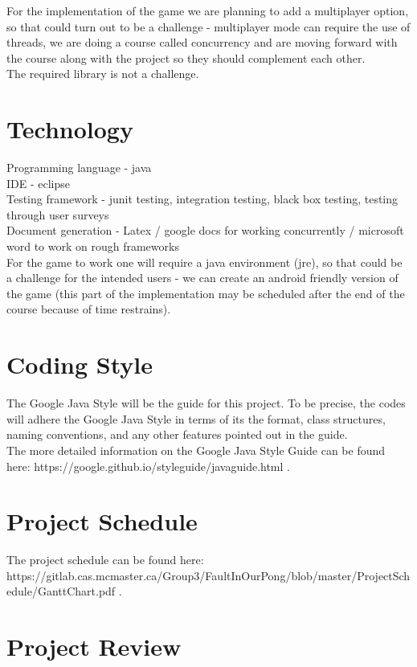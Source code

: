 \documentclass{article}
\begin{document}
For the implementation of the game we are planning to add a multiplayer option, so that could turn out to be a challenge - multiplayer mode can require the use of threads, we are doing a course called concurrency and are moving forward with the course along with the project so they should complement each other.\\

The required library is not a challenge.

\section {Technology}
Programming language - java \\
IDE - eclipse\\
Testing framework - junit testing, integration testing, black box testing, testing through user surveys \\
Document generation - Latex / google docs for working concurrently / microsoft word to work on rough frameworks \\
For the game to work one will require a java environment (jre), so that could be a challenge for the intended users - we can create an android friendly version of the game (this part of the implementation may be scheduled after the end of the course because of time restrains). 

\section {Coding Style}
The Google Java Style will be the guide for this project. To be precise, the codes will adhere the Google Java Style in terms of its the format, class structures, naming conventions, and any other features pointed out in the guide.\\

The more detailed information on the Google Java Style Guide can be found here: https://google.github.io/styleguide/javaguide.html . \\


\section {Project Schedule}

The project schedule can be found here: \\
https://gitlab.cas.mcmaster.ca/Group3/FaultInOurPong/blob/master/ProjectSchedule/GanttChart.pdf . 


\section {Project Review} 
\end{document}
